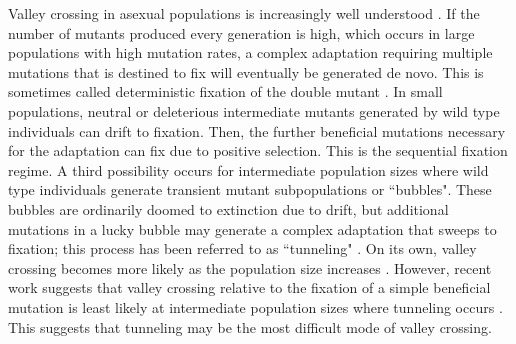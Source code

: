 \documentclass[rmp]{revtex4}
\begin{document}
\begin{spacing}{1.5}
Valley crossing in asexual populations is increasingly well understood \citep{weissman_2009}.
If the number of mutants produced every generation is high, which occurs in large populations with high mutation rates, a complex adaptation requiring multiple mutations that is destined to fix will eventually be generated de novo. This is sometimes called deterministic fixation of the double mutant \citep{weissman_2009}.
In small populations, neutral or deleterious intermediate mutants generated by wild type individuals can drift to fixation. Then, the further beneficial mutations necessary for the adaptation can fix due to positive selection. This is the sequential fixation regime.
A third possibility occurs for intermediate population sizes where wild type individuals generate transient mutant subpopulations or ``bubbles".
These bubbles are ordinarily doomed to extinction due to drift, but additional mutations in a lucky bubble may generate a complex adaptation that sweeps to fixation; this process has been referred to as ``tunneling" \citep{iwasa_2004, weissman_2009}.
On its own, valley crossing becomes more likely as the population size increases \citep{weissman_2009}. However, recent work suggests that valley crossing relative to the fixation of a simple beneficial mutation is least likely at intermediate population sizes where tunneling occurs \citet{ochs_2015}. This suggests that tunneling may be the most difficult mode of valley crossing. 


\end{spacing}
\end{document}
